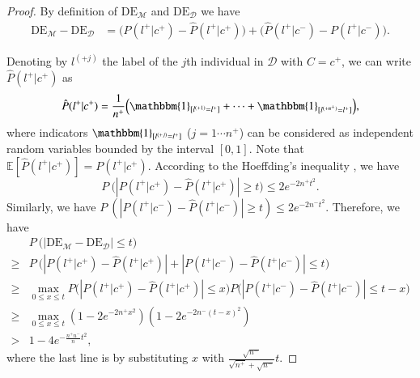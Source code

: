 \documentclass{article}
\begin{document}
\begin{proof}
By definition of $\mathrm{DE}_{\mathcal{M}}$ and $\mathrm{DE}_{\mathcal{D}}$ we have
\begin{equation*}
\begin{split}
\mathrm{DE}_{\mathcal{M}} - \mathrm{DE}_{\mathcal{D}} %
& = \Big( P(l^{+}|c^{+})-\hat{P}(l^{+}|c^{+}) \Big) + \Big( \hat{P}(l^{+}|c^{-})-P(l^{+}|c^{-}) \Big).
\end{split}
\end{equation*}

Denoting by $l^{(+j)}$ the label of the $j$th individual in $\mathcal{D}$ with $C=c^{+}$, we can write $\hat{P}(l^{+}|c^{+})$ as 
\begin{equation*}
\hat{P}(l^{+}|c^{+}) = \frac{1}{n^{+}}\Big( \mathbbm{1}_{[l^{(+1)}=l^{+}]}+\cdots+\mathbbm{1}_{[l^{(+n^{+})}=l^{+}]} \Big),
\end{equation*}
where indicators $\mathbbm{1}_{[l^{(+j)}=l^{+}]}$ ($j=1\cdots n^{+}$) can be considered as independent random variables bounded by the interval $[0, 1]$. Note that $\mathbb{E}[\hat{P}(l^{+}|c^{+})] = P(l^{+}|c^{+})$. According to the Hoeffding's inequality \cite{murphy2012machine}, we have
\begin{equation*}
P~ \bigg( \left| P(l^{+}|c^{+}) - \hat{P}(l^{+}|c^{+}) \right| \geq t \bigg) \leq 2e^{-2n^{+}t^{2}}.
\end{equation*}
Similarly, we have
$P~ \left( \left| P(l^{+}|c^{-}) - \hat{P}(l^{+}|c^{-}) \right| \geq t \right) \leq 2e^{-2n^{-}t^{2}}$.
Therefore, we have
\begin{equation}\label{eq:md}
\begin{split}
& P~ \bigg( \left| \mathrm{DE}_{\mathcal{M}} - \mathrm{DE}_{\mathcal{D}} \right| \leq t \bigg) \\
\geq & P~ \bigg( \left| P(l^{+}|c^{+}) - \hat{P}(l^{+}|c^{+}) \right| + \left| P(l^{+}|c^{-}) - \hat{P}(l^{+}|c^{-}) \right| \leq t \bigg) \\
\geq & \max_{0\leq x \leq t} P \bigg( \left| P(l^{+}|c^{+}) \!-\! \hat{P}(l^{+}|c^{+}) \right| \!\leq\! x \bigg) P \bigg( \left| P(l^{+}|c^{-}) \!-\! \hat{P}(l^{+}|c^{-}) \right| \!\leq\! t\!-\!x \bigg) \\
\geq & \max_{0\leq x \leq t} (1-2e^{-2n^{+}x^{2}})(1-2e^{-2n^{-}(t-x)^{2}}) \\
> & 1-4e^{-\frac{n^{+}n^{-}}{n}t^{2}},
\end{split}
\end{equation}
where the last line is by substituting $x$ with $\frac{\sqrt{n^-}}{\sqrt{n^{+}}+\sqrt{n^{-}}}t$.


\end{proof}
\end{document}
